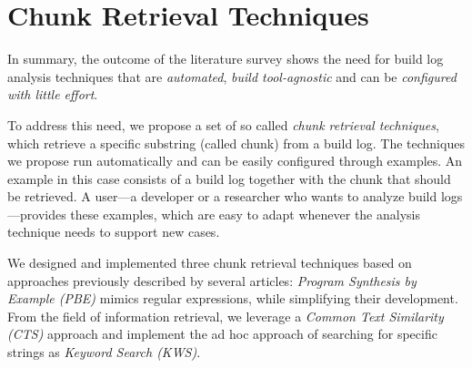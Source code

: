 



\section{Chunk Retrieval Techniques}
\label{sec:techniques}

In summary, the outcome of the literature survey shows the need for
build log
analysis techniques that are \emph{automated},
\emph{build tool-agnostic}
and can be \emph{configured with little effort}.

To address this need,
we propose a set of so called \emph{chunk retrieval techniques},
which retrieve a specific substring (called chunk)
from a build log.
The techniques we propose run automatically
and can be easily configured through examples.
An example in this case consists of a build log together with the
chunk that should be retrieved.
A user---a developer or a researcher who wants to analyze
build logs---provides these examples, which are easy to
adapt whenever the analysis technique needs
to support new cases.

We designed and implemented three chunk retrieval
techniques based on approaches
previously described by several articles:
\emph{Program Synthesis by Example (PBE)}
mimics regular expressions, while simplifying
their development.
From the field of information retrieval, we leverage a
\emph{Common Text Similarity (CTS)} approach
and implement the ad hoc approach of
searching for specific strings as \emph{Keyword Search (KWS)}.

